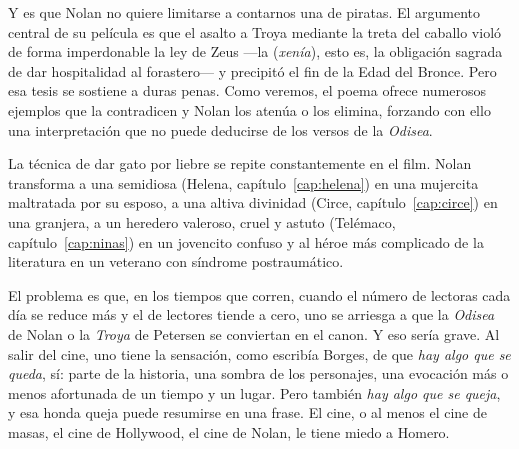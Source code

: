 Y es que Nolan no quiere limitarse a contarnos una de piratas. El argumento central de su película es que el asalto a Troya mediante la treta del caballo violó de forma imperdonable la ley de Zeus ---la  (\emph{xenía}), esto es, la obligación sagrada de dar hospitalidad al forastero--- y precipitó el fin de la Edad del Bronce. Pero esa tesis se sostiene a duras penas. Como veremos, el poema ofrece numerosos ejemplos que la contradicen y Nolan los atenúa o los elimina, forzando con ello una interpretación que no puede deducirse de los versos de la \emph{Odisea}.

La técnica de dar gato por liebre se repite constantemente en el film. Nolan transforma a una semidiosa (Helena, capítulo~\ref{cap:helena}) en una mujercita maltratada por su esposo, a una altiva divinidad (Circe, capítulo~\ref{cap:circe}) en una granjera, a un heredero valeroso, cruel y astuto (Telémaco, capítulo~\ref{cap:ninas}) en un jovencito confuso y al héroe más complicado de la literatura en un veterano con síndrome postraumático.

El problema es que, en los tiempos que corren, cuando el número de lectoras cada día se reduce más y el de lectores tiende a cero, uno se arriesga a que la \emph{Odisea} de Nolan o la \emph{Troya} de Petersen se conviertan en el canon. Y eso sería grave. Al salir del cine, uno tiene la sensación, como escribía Borges, de que \emph{hay algo que se queda}, sí: parte de la historia, una sombra de los personajes, una evocación más o menos afortunada de un tiempo y un lugar. Pero también \emph{hay algo que se queja}, y esa honda queja puede resumirse en una frase. El cine, o al menos el cine de masas, el cine de Hollywood, el cine de Nolan, le tiene miedo a Homero.
